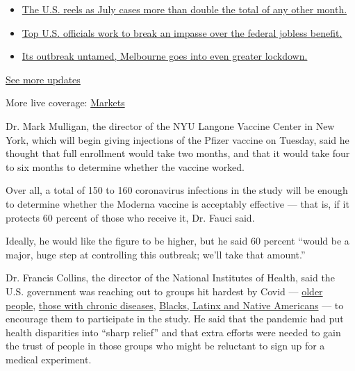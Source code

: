 \begin{itemize}
\tightlist
\item
  \href{https://www.nytimes.com/2020/08/01/world/coronavirus-covid-19.html?action=click\&pgtype=Article\&state=default\&region=MAIN_CONTENT_1\&context=storylines_live_updates\#link-34047410}{The
  U.S. reels as July cases more than double the total of any other
  month.}
\item
  \href{https://www.nytimes.com/2020/08/01/world/coronavirus-covid-19.html?action=click\&pgtype=Article\&state=default\&region=MAIN_CONTENT_1\&context=storylines_live_updates\#link-780ec966}{Top
  U.S. officials work to break an impasse over the federal jobless
  benefit.}
\item
  \href{https://www.nytimes.com/2020/08/01/world/coronavirus-covid-19.html?action=click\&pgtype=Article\&state=default\&region=MAIN_CONTENT_1\&context=storylines_live_updates\#link-2bc8948}{Its
  outbreak untamed, Melbourne goes into even greater lockdown.}
\end{itemize}

\href{https://www.nytimes.com/2020/08/01/world/coronavirus-covid-19.html?action=click\&pgtype=Article\&state=default\&region=MAIN_CONTENT_1\&context=storylines_live_updates}{See
more updates}

More live coverage:
\href{https://www.nytimes.com/live/2020/07/31/business/stock-market-today-coronavirus?action=click\&pgtype=Article\&state=default\&region=MAIN_CONTENT_1\&context=storylines_live_updates}{Markets}

Dr. Mark Mulligan, the director of the NYU Langone Vaccine Center in New
York, which will begin giving injections of the Pfizer vaccine on
Tuesday, said he thought that full enrollment would take two months, and
that it would take four to six months to determine whether the vaccine
worked.

Over all, a total of 150 to 160 coronavirus infections in the study will
be enough to determine whether the Moderna vaccine is acceptably
effective --- that is, if it protects 60 percent of those who receive
it, Dr. Fauci said.

Ideally, he would like the figure to be higher, but he said 60 percent
``would be a major, huge step at controlling this outbreak; we'll take
that amount.''

Dr. Francis Collins, the director of the National Institutes of Health,
said the U.S. government was reaching out to groups hit hardest by Covid
---
\href{https://www.nytimes.com/2020/03/14/health/coronavirus-elderly-protection.html}{older
people},
\href{https://www.nytimes.com/2020/03/12/health/coronavirus-midlife-conditions.html}{those
with chronic diseases},
\href{https://www.nytimes.com/interactive/2020/07/05/us/coronavirus-latinos-african-americans-cdc-data.html}{Blacks,
Latinx and Native Americans} --- to encourage them to participate in the
study. He said that the pandemic had put health disparities into ``sharp
relief'' and that extra efforts were needed to gain the trust of people
in those groups who might be reluctant to sign up for a medical
experiment.

